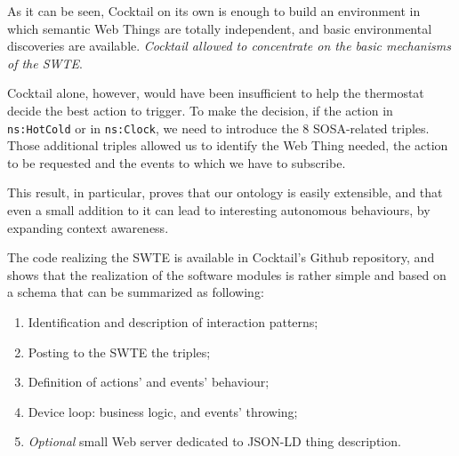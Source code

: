As it can be seen, Cocktail on its own is enough to build an environment in which semantic Web Things are totally independent, and basic environmental discoveries are available. \textit{Cocktail allowed to concentrate on the basic mechanisms of the SWTE}.

Cocktail alone, however, would have been insufficient to help the thermostat decide the best action to trigger. To make the decision, if the action in \texttt{ns:HotCold} or in \texttt{ns:Clock}, we need to introduce the 8 SOSA-related triples. Those additional triples allowed us to identify the Web Thing needed, the action to be requested and the events to which we have to subscribe. 


This result, in particular, proves that our ontology is easily extensible, and that even a small addition to it can lead to interesting autonomous behaviours, by expanding context awareness.


The code realizing the SWTE is available in Cocktail's Github repository, and shows that the realization of the software modules is rather simple and based on a schema that can be summarized as following:

\begin{enumerate}
    \item Identification and description of interaction patterns;
    \item Posting to the SWTE the triples;
    \item Definition of actions' and events' behaviour;
    \item Device loop: business logic, and events' throwing;
    \item \textit{Optional} small Web server dedicated to JSON-LD thing description.
\end{enumerate}


